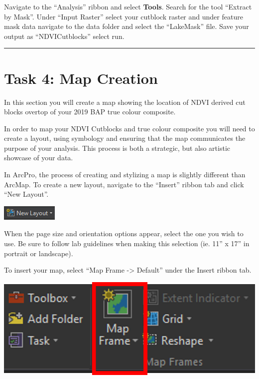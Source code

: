 \documentclass[
]{book}
\begin{document}
Navigate to the ``Analysis'' ribbon and select \textbf{Tools}. Search for the tool ``Extract by Mask''. Under ``Input Raster'' select your cutblock raster and under feature mask data navigate to the data folder and select the ``LakeMask'' file. Save your output as ``NDVICutblocks'' select run.

\begin{center}\rule{0.5\linewidth}{0.5pt}\end{center}

\hypertarget{task-4-map-creation}{%
\section*{Task 4: Map Creation}\label{task-4-map-creation}}

In this section you will create a map showing the location of NDVI derived cut blocks overtop of your 2019 BAP true colour composite.

In order to map your NDVI Cutblocks and true colour composite you will need to create a layout, using symbology and ensuring that the map communicates the purpose of your analysis. This process is both a strategic, but also artistic showcase of your data.

In ArcPro, the process of creating and stylizing a map is slightly different than ArcMap. To create a new layout, navigate to the ``Insert'' ribbon tab and click ``New Layout''.

\begin{center}\includegraphics[width=0.2\linewidth]{images/07-new-layout} \end{center}

When the page size and orientation options appear, select the one you wish to use. Be sure to follow lab guidelines when making this selection (ie. 11'' x 17'' in portrait or landscape).

To insert your map, select ``Map Frame -\textgreater{} Default'' under the Insert ribbon tab.

\begin{center}\includegraphics[width=0.3\linewidth]{images/07-map-frame-default} \end{center}
\end{document}
